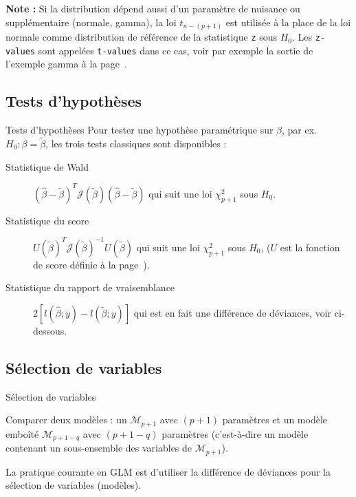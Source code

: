 \documentclass{BeamerTemplate}
\begin{document}
\begin{refsection}
\begin{frame}{}
\bigskip
\textbf{Note :} Si la distribution dépend aussi d'un paramètre de
nuisance ou supplémentaire (normale, gamma), la loi $t_{n-(p+1)}$ est utilisée à la place de la
loi normale comme distribution de référence de la statistique \texttt{z} sous $H_0$. Les \texttt{z-values} sont appelées
\texttt{t-values} dans ce cas, voir par exemple la sortie de l'exemple gamma
à la page~\pageref{Routput.gamma}.
\end{frame}

\subsection{Tests d'hypothèses}
\begin{frame}{Tests d'hypothèses}
Pour tester une hypothèse paramétrique sur $\beta$, par ex.\ $H_0:
\beta=\tilde{\beta}$, les trois tests classiques sont disponibles :

\begin{description}
\item[Statistique de Wald] $(\hat{\beta} -\tilde{\beta})^T {\mathcal J}(\tilde{\beta})
  (\hat{\beta} -\tilde{\beta})$ qui suit une loi $\chi^2_{p+1}$
  sous $H_0$.
\item[Statistique du score] $U(\tilde{\beta})^T {\mathcal
J(\tilde{\beta})}^{-1}U(\tilde{\beta})$ qui suit une loi 
  $\chi^2_{p+1}$ sous $H_0$, ($U$ est la fonction de score définie à la
  page~\pageref{Ufct}).
\item[Statistique du rapport de vraisemblance] $2
  [l(\hat{\beta};y)-l(\tilde{\beta};y)]$ qui est en fait une différence
  de déviances, voir ci-dessous.
\end{description}
\end{frame}

\subsection{Sélection de variables}

\begin{frame}{Sélection de variables}

Comparer deux modèles : un ${\mathcal M}_{p+1}$ avec $(p+1)$
paramètres et un modèle {\color{blue} emboîté} ${\mathcal M}_{p+1-q}$
avec $(p+1-q)$ paramètres (c'est-à-dire un modèle contenant un sous-ensemble des
variables de ${\mathcal M}_{p+1}$).

\bigskip
La pratique courante en GLM est d'utiliser la différence de déviances pour la
sélection de variables (modèles).


\end{frame}
\end{refsection}
\end{document}
